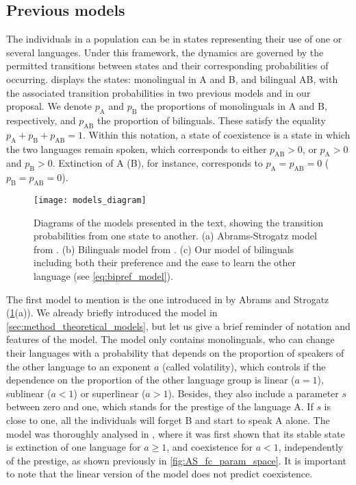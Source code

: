 \documentclass[../thesis.tex]{subfiles}
\begin{document}
\subsection{Previous models}
The individuals in a population can be in states representing their use of one or
several languages. Under this framework, the dynamics are governed by the permitted
transitions between states and their corresponding probabilities of occurring.
 displays the states: monolingual in A and B, and bilingual AB,
with the associated transition probabilities in two previous models and in our proposal.
We denote $p_{\text{A}}$ and $p_{\text{B}}$ the proportions of monolinguals in A and B,
respectively, and $p_{\text{AB}}$ the proportion of bilinguals. These satisfy the
equality $p_{\text{A}} + p_{\text{B}} + p_{\text{AB}} = 1$. Within this notation, a
state of coexistence is a state in which the two languages remain spoken, which
corresponds to either $p_{\text{AB}} > 0$, or $p_{\text{A}} > 0$ and $p_{\text{B}} > 0$.
Extinction of A (B), for instance, corresponds to $p_{\text{A}} = p_{\text{AB}} = 0$
($p_{\text{B}} = p_{\text{AB}} = 0$).
\begin{figure}
\centering
  \texttt{[image: models\_diagram]}
  \caption{Diagrams of the models presented in the text, showing the transition
  probabilities from one state to another. (a) Abrams-Strogatz model from
  \cite{AbramsModellingDynamics2003}. (b) Bilinguals model from
  \cite{CastelloOrderingDynamics2006}. (c) Our model of bilinguals including both
  their preference and the ease to learn the other language (see
  \cref{eq:bipref_model}).}
  \label{fig:models_diagram}
\end{figure}

The first model to mention is the one introduced in \cite{AbramsModellingDynamics2003}
by Abrams and Strogatz (\cref{fig:models_diagram}(a)). We already briefly introduced the
model in \cref{sec:method_theoretical_models}, but let us give a brief reminder of
notation and features of the model. The model only contains monolinguals, who can change
their languages with a probability that depends on the proportion of speakers of the
other language to an exponent $a$ (called volatility), which controls if the dependence
on the proportion of the other language group is linear ($a = 1$), sublinear ($a<1$) or
superlinear ($a>1$). Besides, they also include a parameter $s$ between zero and one,
which stands for the prestige of the language A. If $s$ is close to one, all the
individuals will forget B and start to speak A alone.
The model was thoroughly analysed in \cite{VazquezAgentBased2010}, where it was first
shown that its stable state is extinction of one language for $a \ge 1$, and coexistence
for $a < 1$, independently of the prestige, as shown previously in
\cref{fig:AS_fc_param_space}.
It is important to note that the linear version of the model does not predict
coexistence.    
\end{document}
